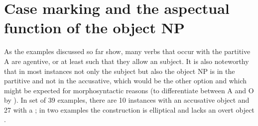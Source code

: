 \documentclass[output=paper]{LSP/langsci}
\begin{document}
\section{Case marking and the aspectual function of the object NP}\label{15-hu-sec:3}

As the examples discussed so far show, many verbs that occur with the partitive A are agentive, or at least such that they allow an  subject. It is also noteworthy that in most instances not only the subject but also the object NP is in the partitive and not in the accusative, which would be the other option and which might be expected for morphosyntactic reasons (\ie to differentiate between A and O by ). In  set of 39 examples, there are 10 instances with an accusative object and 27 with a ; in two examples the construction is elliptical and lacks an overt object . 
\end{document}
